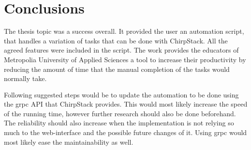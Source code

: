 
\chapter{Conclusions} \label{ch:conc}

The thesis topic was a success overall.
It provided the user an automation script, that handles a variation of tasks that can be done with ChirpStack.
All the agreed features were included in the script.
The work provides the educators of Metropolia University of Applied Sciences a tool to increase their productivity by reducing the amount of time that the manual completion of the tasks would normally take.

Following suggested steps would be to update the automation to be done using the \gls{grpc} API that ChirpStack provides.
This would most likely increase the speed of the running time, however further research should also be done beforehand.
The reliability should also increase when the implementation is not relying so much to the web-interface and the possible future changes of it.
Using \gls{grpc} would most likely ease the maintainability as well.


\clearpage %

